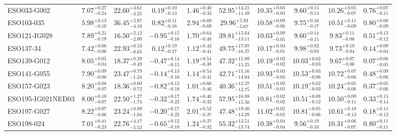 \documentclass[onecolumn]{mn2e}
\begin{document}
\begin{landscape}
{\begin{center}
\begin{longtable}{lccccccccc}
ESO033-G002 & $7.07_{-0.24}^{+0.27}$ & $22.60_{-3.25}^{+3.61}$ & $0.19_{-0.13}^{+0.10}$ & $1.46_{-0.33}^{+0.40}$ &$52.95_{-11.49}^{+14.21}$ & $10.35_{-0.03}^{+0.03}$ & $9.60_{-0.14}^{+0.15}$ & $10.26_{-0.07}^{+0.05}$ & $0.76_{-0.11}^{+0.07}$ \\
ESO103-035 & $5.98_{-0.10}^{+0.13}$ & $36.45_{-4.10}^{+3.87}$ & $0.82_{-0.18}^{+0.11}$ & $2.94_{-0.69}^{+0.69}$ &$29.96_{-5.67}^{+5.93}$ & $10.58_{-0.06}^{+0.09}$ & $9.75_{-0.17}^{+0.16}$ & $10.51_{-0.09}^{+0.11}$ & $0.80_{-0.09}^{+0.08}$ \\
ESO121-IG028 & $7.89_{-0.19}^{+0.21}$ & $16.50_{-2.00}^{+2.12}$ & $-0.95_{-0.16}^{+0.15}$ & $1.70_{-0.48}^{+0.64}$ &$39.81_{-13.11}^{+15.64}$ & $10.03_{-0.05}^{+0.09}$ & $9.60_{-0.15}^{+0.14}$ & $9.83_{-0.06}^{+0.11}$ & $0.51_{-0.12}^{+0.13}$ \\
ESO137-34 & $7.42_{-0.06}^{+0.06}$ & $22.93_{-0.65}^{+0.53}$ & $0.12_{-0.17}^{+0.19}$ & $1.12_{-0.41}^{+0.43}$ &$49.75_{-16.37}^{+17.07}$ & $10.17_{-0.01}^{+0.03}$ & $9.98_{-0.03}^{+0.02}$ & $9.73_{-0.04}^{+0.10}$ & $0.14_{-0.04}^{+0.09}$ \\
ESO139-G012 & $8.05_{-0.04}^{+0.05}$ & $18.37_{-0.49}^{+0.39}$ & $-0.47_{-0.15}^{+0.14}$ & $1.19_{-0.38}^{+0.54}$ &$47.32_{-15.25}^{+15.89}$ & $10.19_{-0.02}^{+0.02}$ & $10.03_{-0.03}^{+0.02}$ & $9.67_{-0.06}^{+0.07}$ & $0.07_{-0.05}^{+0.06}$ \\
ESO141-G055 & $7.90_{-0.06}^{+0.09}$ & $23.47_{-1.24}^{+0.79}$ & $-0.14_{-0.16}^{+0.13}$ & $1.14_{-0.41}^{+0.54}$ &$42.71_{-14.04}^{+15.16}$ & $10.93_{-0.03}^{+0.03}$ & $10.53_{-0.06}^{+0.03}$ & $10.72_{-0.06}^{+0.07}$ & $0.48_{-0.06}^{+0.09}$ \\
ESO157-G023 & $8.20_{-0.07}^{+0.08}$ & $18.36_{-0.72}^{+0.60}$ & $-0.82_{-0.18}^{+0.12}$ & $1.01_{-0.46}^{+0.60}$ &$40.36_{-12.75}^{+12.37}$ & $10.51_{-0.03}^{+0.02}$ & $10.19_{-0.03}^{+0.02}$ & $10.24_{-0.06}^{+0.05}$ & $0.37_{-0.06}^{+0.05}$ \\
ESO195-IG021NED03 & $8.00_{-0.07}^{+0.10}$ & $22.50_{-1.74}^{+1.27}$ & $-0.32_{-0.23}^{+0.17}$ & $1.74_{-0.32}^{+0.40}$ &$57.95_{-15.50}^{+16.88}$ & $10.81_{-0.02}^{+0.02}$ & $10.51_{-0.12}^{+0.08}$ & $10.50_{-0.11}^{+0.09}$ & $0.33_{-0.14}^{+0.15}$ \\
ESO197-G027 & $8.22_{-0.06}^{+0.07}$ & $23.24_{-1.04}^{+0.89}$ & $-0.20_{-0.22}^{+0.17}$ & $2.01_{-0.37}^{+0.52}$ &$47.48_{-13.29}^{+19.40}$ & $11.02_{-0.02}^{+0.02}$ & $10.81_{-0.06}^{+0.05}$ & $10.61_{-0.13}^{+0.10}$ & $0.18_{-0.12}^{+0.11}$ \\
ESO198-024 & $7.01_{-0.23}^{+0.41}$ & $22.76_{-5.52}^{+4.17}$ & $-0.65_{-0.18}^{+0.12}$ & $1.24_{-0.32}^{+0.37}$ &$55.32_{-13.74}^{+13.51}$ & $10.38_{-0.04}^{+0.04}$ & $9.56_{-0.33}^{+0.19}$ & $10.31_{-0.07}^{+0.06}$ & $0.80_{-0.11}^{+0.11}$ \\

\end{longtable}
\end{center}}
\end{landscape}
\end{document}
